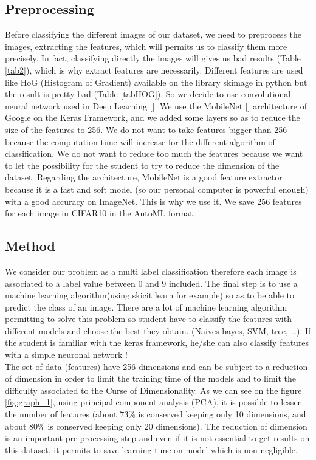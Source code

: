 \documentclass[10pt, a4paper, twocolumn]{article} %
\begin{document}
\subsection{Preprocessing}
Before classifying the different images of our dataset, we need to preprocess the images, extracting the features, which will permits us to classify them more precisely. In fact, classifying directly the images will gives us bad results (Table \ref{tab2}), which is why extract features are necessarily.  Different features are used like HoG (Histogram of Gradient) available on the library skimage in python but the result is pretty bad (Table \ref{tabHOG}). So we decide to use convolutional neural network used in Deep Learning [\cite{2}].  We use the MobileNet [\cite{3}] architecture of Google on the Keras Framework, and we added some layers so as to reduce the size of the features to 256. We do not want to take features bigger than 256 because the computation time will increase for the different algorithm of classification. We do not want to reduce too much the features because we want to let the possibility for the student to try to reduce the dimension of the dataset.  Regarding the architecture, MobileNet is a good feature extractor because it is a fast and soft model (so our personal computer is powerful enough) with a good accuracy on ImageNet. This is why we use it. We save 256 features for each image in CIFAR10 in the AutoML format. 

\subsection{Method}
We consider our problem as a multi label classification therefore each image is associated to a label value between 0 and 9 included. The final step is to use a machine learning algorithm(using skicit learn for example) so as to be able to predict the class of an image. There are a lot of machine learning algorithm permitting to solve this problem so student have to classify the features with different models and choose the best they obtain. (Naives bayes, SVM, tree, …).
If the student is familiar with the keras framework, he/she can also classify features with a simple neuronal network ! \\The set of data (features) have 256 dimensions and can be subject to a reduction of dimension in order to limit the training time of the models and to limit the difficulty associated to the Curse of Dimensionality. As we can see on the figure \ref{fig:graph_1}, using  principal component analysis (PCA), it is possible to lessen the number of features (about $73\%$ is conserved keeping only 10 dimensions, and about $80\%$ is conserved keeping only 20 dimensions). The reduction of dimension is an important pre-processing step and even if it is not essential to get
results on this dataset, it permits to save learning time on model which is non-negligible.
\\
\end{document}
